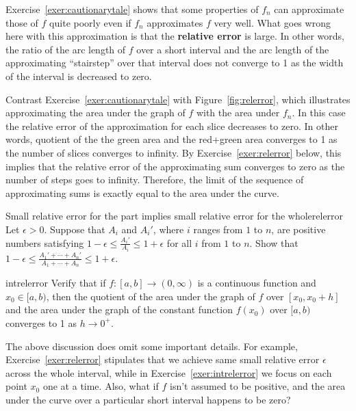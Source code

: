 \documentclass[svgnames]{watsonbook}
\begin{document}
Exercise~\ref{exer:cautionarytale} shows that some properties of $f_n$
can approximate those of $f$ quite poorly even if $f_n$ approximates
$f$ very well. What goes wrong here with this approximation is that
the \textbf{relative error} is large. In other words, the ratio of the
arc length of $f$ over a short interval and the arc length of the
approximating ``stairstep'' over that interval does not converge to 1
as the width of the interval is decreased to zero.

Contrast Exercise~\ref{exer:cautionarytale} with
Figure~\ref{fig:relerror}, which illustrates approximating the area
under the graph of $f$ with the area under $f_n$. In this case the
relative error of the approximation for each slice decreases to
zero. In other words, quotient of the the green area and the red+green
area converges to 1 as the number of slices converges to infinity. By
Exercise~\ref{exer:relerror} below, this implies that the relative
error of the approximating sum converges to zero as the number of
steps goes to infinity. Therefore, the limit of the sequence of
approximating sums is exactly equal to the area under the curve.

\begin{exercise}{Small relative error for the part implies small
    relative error for the whole}{relerror}
  Let $\epsilon > 0$. Suppose that $A_i$ and $A_i'$, where $i$ ranges
  from $1$ to $n$, are positive numbers satisfying
  $1-\epsilon \leq \frac{A_{i}'}{A_{i}} \leq 1 + \epsilon$ for all $i$
  from $1$ to $n$. Show that
  $1-\epsilon \leq \frac{A_1'+\cdots+A_n'}{A_1+\cdots+A_n} \leq 1 +
  \epsilon$.  
\end{exercise}

\begin{exercise}{}{intrelerror}
  Verify that if $f:[a,b] \to (0,\infty)$ is a continuous function and
  $x_0 \in [a,b)$, then the quotient of the area under the graph of $f$ over
  $[x_0,x_0+h]$ and the area under the graph of the constant function
  $f(x_0)$ over $[a,b)$ converges to 1 as $h \to 0^+$. 
\end{exercise}

The above discussion does omit some important details. For example,
Exercise~\ref{exer:relerror} stipulates that we achieve same small
relative error $\epsilon$ across the whole interval, while in
Exercise~\ref{exer:intrelerror} we focus on each point $x_0$ one at a
time. Also, what if $f$ isn't assumed to be positive, and the area
under the curve over a particular short interval happens to be zero?
\end{document}
